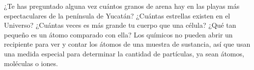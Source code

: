 \begin{opening}
    ¿Te has preguntado alguna vez cuántos granos de arena hay en las playas más espectaculares de la
    península de Yucatán? ¿Cuántas estrellas existen en el Universo? ¿Cuántas veces es más grande tu
    cuerpo que una célula? ¿Qué tan pequeño es un átomo comparado con ella?
    Los químicos no pueden abrir un recipiente para ver y contar los átomos de
    una muestra de sustancia, así que usan
    una medida especial para determinar la cantidad de partículas, ya sean átomos, moléculas o iones.
\end{opening}